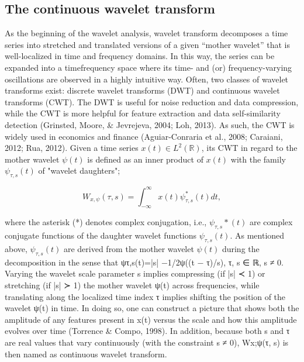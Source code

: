 \documentclass[a4paper,fleqn]{cas-sc}
\begin{document}
\subsection{The continuous wavelet transform}
As the beginning of the wavelet analysis, wavelet transform decomposes a time series into stretched and translated versions of a given “mother wavelet” that is well-localized in time and frequency domains. In this way, the series can be expanded into a timefrequency space where its time- and (or) frequency-varying oscillations are observed in a highly intuitive way. Often, two classes of wavelet transforms exist: discrete wavelet transforms (DWT) and continuous wavelet transforms (CWT). The DWT is useful for noise reduction and data compression, while the CWT is more helpful for feature extraction and data self-similarity detection (Grinsted, Moore, \& Jevrejeva, 2004; Loh, 2013). As such, the CWT is widely used in economics and finance (Aguiar-Conraria et al., 2008; Caraiani, 2012; Rua, 2012).
Given a time series $x(t)\in L^2(\mathbb{R})$, its CWT in regard to the mother wavelet $\psi(t)$ is defined as an inner product of $x(t)$ with the family $\psi_{\tau,s}(t)$ of "wavelet daughters";

\begin{equation}
    W_{x,\psi}(\tau,s)=\int_{-\infty}^{\infty}x(t)\psi_{\tau,s}^*(t)dt,
\end{equation}

where the asterisk (*) denotes complex conjugation, i.e., $\psi_{\tau,s}*(t)$ are complex conjugate functions of the daughter wavelet functions $\psi_{\tau,s}(t)$. As mentioned above, $\psi_{\tau,s}(t)$ are derived from the mother wavelet $\psi(t)$ during the decomposition in the sense that ψτ,s(t)=|s| −1/2ψ((t − τ)/s), τ, s ∈ ℝ, s ≠ 0. Varying the wavelet scale parameter s implies compressing (if |s| ≺ 1) or stretching (if |s| ≻ 1) the mother wavelet ψ(t) across frequencies, while translating along the localized time index τ implies shifting the position of the wavelet ψ(t) in time. In doing so, one can construct a picture that shows both the amplitude of any features present in x(t) versus the scale and how this amplitude evolves over time (Torrence & Compo, 1998). In addition, because both s and τ are real values that vary continuously (with the constraint s ≠ 0), Wx;ψ(τ, s) is then named as continuous wavelet transform.


\end{document}
